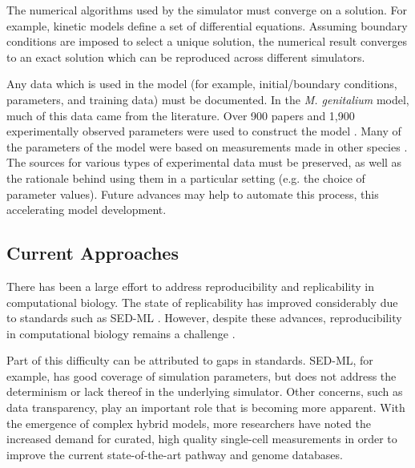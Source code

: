 \documentclass[journal,transmag,twoside]{IEEEtran}
\begin{document}
The numerical algorithms used by the simulator must converge on a solution.
For example, kinetic models define a set of differential equations.
Assuming boundary conditions are imposed to select a unique solution,
the numerical result converges to an exact solution which can be reproduced across different simulators.

Any data which is used in the model (for example, initial/boundary conditions, parameters, and training data)
must be documented.
In the \textit{M. genitalium} model, much of this data came from the literature.
Over 900 papers and 1,900 experimentally observed parameters were used to construct the model \cite{Karr2012}.
Many of the parameters of the model were based on measurements made in other species \cite{macklin2014future}.
The sources for various types of experimental data must be preserved,
as well as the rationale behind using them in a particular setting
(e.g. the choice of parameter values).
Future advances may help to automate this process, this accelerating model development.

\subsection{Current Approaches}

There has been a large effort to address reproducibility and replicability in computational biology.
The state of replicability has improved considerably due to standards such as SED-ML \cite{sedml2011}.
However, despite these advances, reproducibility in computational biology remains a challenge \cite{garijo2013quantifying}.

Part of this difficulty can be attributed to gaps in standards.
SED-ML, for example, has good coverage of simulation parameters, but
does not address the determinism or lack thereof in the underlying simulator.
Other concerns, such as data transparency, play an important role that is becoming more apparent.
With the emergence of complex hybrid models, more researchers have noted the increased demand for curated, high quality single-cell measurements in order to improve the current state-of-the-art pathway and genome databases.
\end{document}
